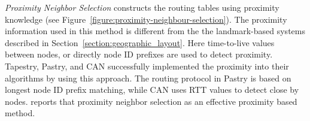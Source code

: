 \emph{Proximity Neighbor Selection} constructs the routing tables using
proximity knowledge (see Figure~\ref{figure:proximity-neighbour-selection}). The
proximity information used in this method is different from the the
landmark-based systems described in Section~\ref{section:geographic_layout}.
Here time-to-live values between nodes, or directly node ID prefixes are used to
detect proximity. Tapestry, Pastry, and CAN successfully implemented the
proximity into their algorithms by using this approach. The routing protocol in
Pastry is based on longest node ID prefix matching, while CAN uses RTT values to
detect close by nodes. \cite{CDCR2002a} reports that proximity neighbor
selection as an effective proximity based method.
